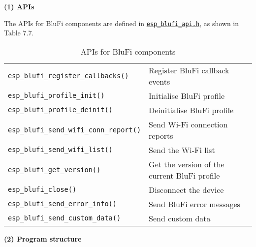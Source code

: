 \documentclass[a4paper,12pt]{book}
\begin{document}
\textbf{(1) APIs}

The APIs for BluFi components are defined in \href{https://github.com/espressif/esp-idf/blob/master/components/bt/common/api/include/api/esp_blufi_api.h}{\texttt{esp\_blufi\_api.h}}, as shown in Table 7.7.

\begin{table}[h!]
    \renewcommand{\arraystretch}{1.1}
    \caption{APIs for BluFi components}
    \begin{tabular}{|>{\small}m{}|>{\small}m{}|}
        \hline
        \rowcolor{LightBlue}\multicolumn{1}{|c|}{\textbf{API}}&\multicolumn{1}{c|}{\textbf{Description}}\\
        \hline
        \verb|esp_blufi_register_callbacks()|&Register BluFi callback events\\
        \hline
        \verb|esp_blufi_profile_init()|&Initialise BluFi profile\\
        \hline
        \verb|esp_blufi_profile_deinit()|&Deinitialise BluFi profile\\
        \hline
        \verb|esp_blufi_send_wifi_conn_report()|&Send Wi-Fi connection reports\\
        \hline
        \verb|esp_blufi_send_wifi_list()|&Send the Wi-Fi list\\
        \hline
        \verb|esp_blufi_get_version()|&Get the version of the current BluFi profile\\
        \hline
        \verb|esp_blufi_close()|&Disconnect the device\\
        \hline
        \verb|esp_blufi_send_error_info()|&Send BluFi error messages\\
        \hline
        \verb|esp_blufi_send_custom_data()|&Send custom data\\
        \hline
    \end{tabular}
\end{table}

\textbf{(2) Program structure}
\end{document}
